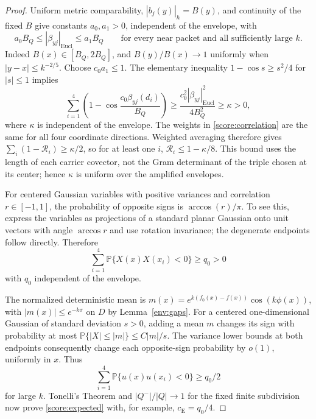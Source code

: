 \begin{proof}
Uniform metric comparability, $|b_j(y)|_h=B(y)$, and continuity of the
fixed $B$ give constants $a_0,a_1>0$, independent of the envelope, with
\[
 a_0B_Q\le|\beta_{yj}|_{\mathrm{Eucl}}\le a_1B_Q
 \qquad\text{for every near packet and all sufficiently large }k.
\]
Indeed $B(x)\in[B_Q,2B_Q]$, and $B(y)/B(x)\to1$ uniformly when
$|y-x|\le k^{-2/5}$.  Choose $c_0a_1\le1$.  The elementary inequality
$1-\cos s\ge s^2/4$ for $|s|\le1$ implies
\[
 \sum_{i=1}^4\left(1-\cos\frac{c_0\beta_{yj}(d_i)}{B_Q}\right)
 \ge\frac{c_0^2|\beta_{yj}|_{\mathrm{Eucl}}^2}{4B_Q^2}
 \ge\kappa>0,
\]
where $\kappa$ is independent of the envelope. The weights in
\eqref{score:correlation} are the same for all four coordinate directions.
Weighted averaging therefore gives $\sum_i(1-\mathcal R_i)\ge\kappa/2$,
so for at least one $i$, $\mathcal R_i\le1-\kappa/8$. This bound uses
the length of each carrier covector, not the Gram determinant of the
triple chosen at its center; hence $\kappa$ is uniform over the amplified
envelopes.

For centered Gaussian variables with positive variances and correlation
$r\in[-1,1]$, the probability of opposite signs is $\arccos(r)/\pi$.
To see this, express the variables as projections of a standard planar
Gaussian onto unit vectors with angle $\arccos r$ and use rotation
invariance; the degenerate endpoints follow directly.  Therefore
\[
 \sum_{i=1}^4\mathbb P\{X(x)X(x_i)<0\}\ge q_0>0
\]
with $q_0$ independent of the envelope.

The normalized deterministic mean is
$m(x)=e^{k(f_0(x)-f(x))}\cos(k\phi(x))$, with
$|m(x)|\le e^{-k\sigma}$ on $D$ by Lemma~\ref{env:gaps}.
For a centered one-dimensional Gaussian of standard deviation $s>0$,
adding a mean $m$ changes its sign with probability at most
$\mathbb P\{|X|\le|m|\}\le C|m|/s$.
The variance lower bounds at both endpoints consequently change each
opposite-sign probability by $o(1)$, uniformly in $x$.  Thus
\[
 \sum_{i=1}^4\mathbb P\{u(x)u(x_i)<0\}\ge q_0/2
\]
for large $k$.  Tonelli's Theorem and
$|Q^-|/|Q|\to1$ for the fixed finite subdivision now prove
\eqref{score:expected} with, for example, $c_{\mathrm E}=q_0/4$.
\end{proof}

